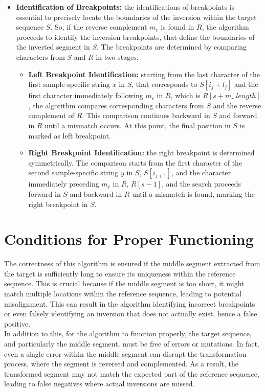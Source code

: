 \begin{itemize}
    \item \textbf{Identification of Breakpoints: } the identifications of breakpoints is essential to precisely locate the boundaries of the inversion within the target sequence \( S \). So, if the reverse complement \( m_r \) is found in \( R \), the algorithm proceeds to identify the inversion breakpoints, that define the boundaries of the inverted segment in \( S \). The breakpoints are determined by comparing characters from \( S \) and \( R \) in two stages:
    \begin{itemize}
    	\item \textbf{Left Breakpoint Identification: } starting from the last character of the first sample-specific string \( x \) in \( S \), that corresponds to \( S[i_j + l_j] \) and the first character immediately following \( m_r \) in \( R \), which is \( R[s + m_r .length] \), the algorithm compares corresponding characters from \( S \) and the reverse complement of \( R \). This comparison continues backward in \( S \) and forward in \( R \) until a mismatch occurs. At this point, the final position in \( S \) is marked as left breakpoint.
    	\item \textbf{Right Breakpoint Identification: } the right breakpoint is determined symmetrically. The comparison starts from the first character of the second sample-specific string \( y \) in \( S \), \( S[i_{j+1}] \), and the character immediately preceding \( m_r \) in \( R \), \( R[s - 1] \), and the search proceeds forward in \( S \) and backward in \( R \) until a mismatch is found, marking the right breakpoint in \( S \). 
    \end{itemize}
\end{itemize}

\section{Conditions for Proper Functioning}

The correctness of this algorithm is ensured if the middle segment extracted from the target is sufficiently long to ensure its uniqueness within the reference sequence. This  is crucial because if the middle segment is too short, it might match multiple locations within the reference sequence, leading to potential misalignment. This  can result in the algorithm identifying incorrect breakpoints or even falsely identifying an inversion that does not actually exist, hence a false positive. \\
In addition to this, for the algorithm to function properly, the target sequence, and particularly the middle segment, must be free of errors or mutations. In fact, even a single error within the middle segment can disrupt the transformation process, where the segment is reversed and complemented. As a result, the transformed segment may not match the expected part of the reference sequence, leading to false negatives where actual inversions are missed. 
